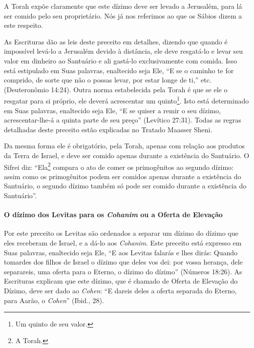 A Torah expõe claramente que este dízimo deve ser levado a Jerusalém,
para lá ser comido pelo seu proprietário. Nós já nos referimos ao que os
Sábios dizem a este respeito.

As Escrituras dão as leis deste preceito em detalhes, dizendo que quando
é impossível levá-lo a Jerusalém devido à distância, ele deve resgatá-lo
e levar seu valor em dinheiro ao Santuário e ali gastá-lo
exclusivamente com comida. Isso está estipulado em Suas palavras,
enaltecido seja Ele, ``E se o caminho te for comprido, de sorte que não o possas levar, por estar longe de ti,'' etc. (Deuteronômio 14:24). Outra norma estabelecida pela Torah é que se ele o resgatar para si próprio, ele deverá acrescentar um
quinto\footnote{Um quinto de seu valor.}. Isto está determinado em Suas palavras,
enaltecido seja Ele, ``E se quiser a remir o seu dízimo, acrescentar-lhe-á a quinta parte de seu preço'' (Levítico 27:31).
Todas as regras detalhadas deste preceito estão explicadas no Tratado Maasser
Sheni.

Da mesma forma ele é obrigatório, pela Torah, apenas com relação aos
produtos da Terra de Israel, e deve ser comido apenas durante a
existência do Santuário. O Sifrei diz: ``Ela\footnote{A Torah.}
compara o ato de comer os primogênitos ao segundo dízimo: assim como os
primogênitos podem ser comidos apenas durante a existência do
Santuário, o segundo dízimo também só pode ser comido durante a
existência do Santuário''.

\paragraph{O dízimo dos Levitas para os \textit{Cohanim} ou a Oferta de Elevação}

Por este preceito os Levitas são ordenados a separar um dízimo do dízimo
que eles receberam de Israel, e a dá-lo aos \textit{Cohanim}. Este preceito
está expresso em Suas palavras, enaltecido seja Ele, ``E aos Levitas
falarás e lhes dirás: Quando tomardes dos filhos de Israel o dízimo que
deles vos dei: por vossa herança, dele separareis, uma oferta para o
Eterno, o dízimo do dízimo'' (Números 18:26). As Escrituras explicam que
este dízimo, que é chamado de Oferta de Elevação do Dízimo, deve ser
dado ao \textit{Cohen}: ``E dareis deles a oferta separada do Eterno, para
Aarão, o \textit{Cohen}'' (Ibid., 28).

